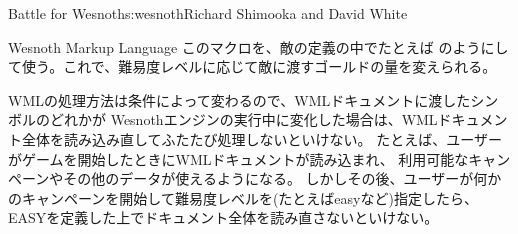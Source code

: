 \begin{aosachapter}{Battle for Wesnoth}{s:wesnoth}{Richard Shimooka and David White}
\begin{aosasect1}{Wesnoth Markup Language}
\noindent
このマクロを、敵の定義の中でたとえば
のようにして使う。これで、難易度レベルに応じて敵に渡すゴールドの量を変えられる。

WMLの処理方法は条件によって変わるので、WMLドキュメントに渡したシンボルのどれかが
Wesnothエンジンの実行中に変化した場合は、WMLドキュメント全体を読み込み直してふたたび処理しないといけない。
たとえば、ユーザーがゲームを開始したときにWMLドキュメントが読み込まれ、
利用可能なキャンペーンやその他のデータが使えるようになる。
しかしその後、ユーザーが何かのキャンペーンを開始して難易度レベルを(たとえばeasyなど)指定したら、
EASYを定義した上でドキュメント全体を読み直さないといけない。


\end{aosasect1}
\end{aosachapter}
